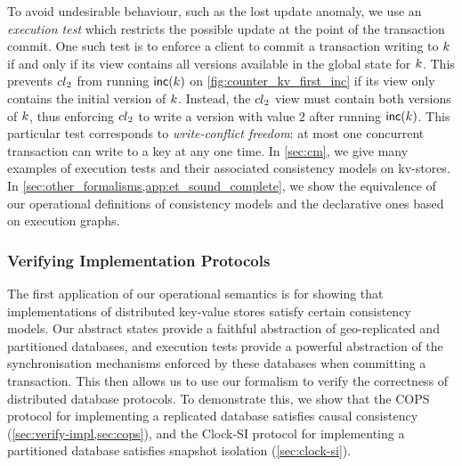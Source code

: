 To avoid undesirable behaviour, such as the lost update anomaly, we
use an {\em execution test} which restricts the possible update at the
point of the transaction commit.  One such test is to enforce a client
to commit a transaction writing to \(k\) if and only if its view
contains all versions available in the global state for \(k\).  This
prevents \({cl}_2\) from running \(\mathsf{inc}(k)\) on
\cref{fig:counter_kv_first_inc} if its view only contains the initial
version of \(k\).  Instead, the \({cl}_2\) view must contain both
versions of \(k\), thus enforcing \({cl}_2\) to write a version with
value \(2\) after running \(\mathsf{inc}(k)\). This particular test
corresponds to \emph{write-conflict freedom}:
at most one concurrent transaction can write to a key at any one time.
In \cref{sec:cm}, we give many examples of execution tests and their
associated consistency models on kv-stores. 
In \cref{sec:other_formalisms,app:et_sound_complete},
we show the equivalence of our operational definitions of consistency models and 
the declarative ones based on execution graphs. 

\subsubsection{Verifying Implementation Protocols} 
The first application of our operational
semantics is for showing that implementations of distributed
key-value stores satisfy certain consistency models. 
Our abstract states provide a 
faithful abstraction of geo-replicated and partitioned
databases, and execution tests provide a powerful abstraction of the synchronisation mechanisms 
enforced by these databases when committing a transaction. 
This then allows us to use our 
formalism to verify the correctness of distributed database protocols. 
To demonstrate this, we show that the
COPS protocol \citep{cops} for implementing a replicated database satisfies causal consistency  (\cref{sec:verify-impl,sec:cops}), 
and the Clock-SI protocol \citep{clocksi} for implementing a
partitioned database satisfies snapshot isolation (\cref{sec:clock-si}). 


